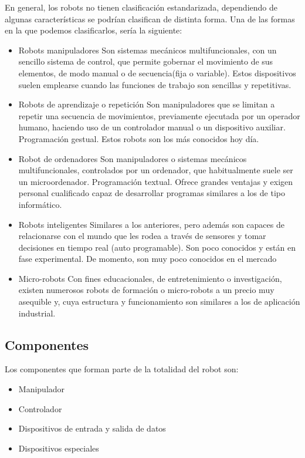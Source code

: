 \documentclass[12pt,a4papert,woside,openright,titlepage,final]{book}
\begin{document}
En general, los robots no tienen clasificación estandarizada, dependiendo de
algunas características se podrían clasifican de distinta forma. Una de las
formas en la que podemos clasificarlos, sería la siguiente: 
\begin{itemize}
    \item Robots manipuladores
    Son sistemas mecánicos multifuncionales, con un sencillo sistema de control,
    que permite gobernar el movimiento de sus elementos, de modo manual o de
    secuencia(fija o variable).  Estos dispositivos suelen emplearse cuando las
    funciones de trabajo son sencillas y repetitivas.
    \item Robots de aprendizaje o repetición
    Son manipuladores que se limitan a repetir una secuencia de movimientos,
    previamente ejecutada por un operador humano, haciendo uso de un
    controlador manual o un dispositivo auxiliar. Programación gestual. 
    Estos robots son los más conocidos hoy día.
    \item Robot de ordenadores
    Son manipuladores o sistemas mecánicos multifuncionales, controlados por un
    ordenador, que habitualmente suele ser un microordenador. Programación textual. 
    Ofrece grandes ventajas y exigen personal cualificado capaz de desarrollar
    programas similares a los de tipo informático.
    \item Robots inteligentes
    Similares a los anteriores, pero además son capaces de relacionarse con el mundo
    que les rodea a través de sensores y tomar decisiones en tiempo real (auto
    programable).
    Son poco conocidos y están en fase experimental. 
    De momento, son muy poco conocidos en el mercado
    \item Micro-robots
    Con fines educacionales, de entretenimiento o investigación, existen numerosos
    robots de formación o micro-robots a un precio muy asequible y, cuya estructura
    y funcionamiento son similares a los de aplicación industrial.
\end{itemize}


\subsection{Componentes}

Los componentes que forman parte de la totalidad del robot son:

\begin{itemize}
    \item Manipulador
    \item Controlador
    \item Dispositivos de entrada y salida de datos
    \item Dispositivos especiales
\end{itemize}
\end{document}

